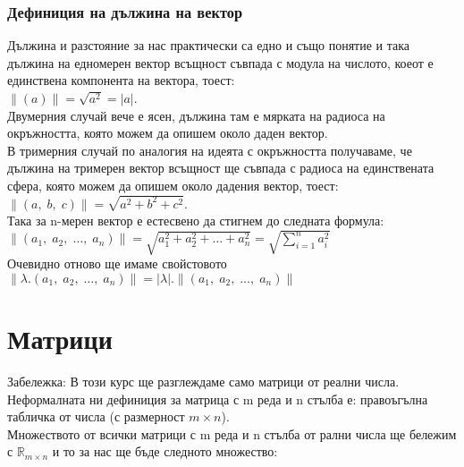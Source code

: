\documentclass[12pt]{article}
\newcommand{\R}{\mathbb{R}}
\begin{document}
\subsubsection*{Дефиниция на дължина на вектор}

Дължина и разстояние за нас практически са едно и също понятие и така
дължина на едномерен вектор всъщност съвпада с модула на числото, коеот е единствена компонента на вектора, тоест:\\

$\|(a)\| = \sqrt{a^2} = |a|$. \\

Двумерния случай вече е ясен, дължина там е мярката на радиоса на окръжността, която можем да опишем около даден вектор. \\

В тримерния случай по аналогия на идеята с окръжността получаваме, че дължина на тримерен вектор всъщност
ще съвпада с радиоса на единствената сфера, която можем да опишем около дадения вектор, тоест: \\

$\|(a, \; b, \; c)\| = \sqrt{a^2 + b^2 + c^2}$. \\

Така за n-мерен вектор е естесвено да стигнем до следната формула: \\

$\|(a_1, \; a_2, \; \dots, \; a_n)\| = \sqrt{a_1^2 + a_2^2 + \dots + a_n^2} = \sqrt{\displaystyle\sum_{i = 1}^n a_i^2}$ \\

Очевидно отново ще имаме свойстовото $\|\lambda.(a_1, \; a_2, \; \dots, \; a_n)\| = |\lambda|.\|(a_1, \; a_2, \; \dots, \; a_n)\|$

\section*{Матрици}

Забележка: В този курс ще разглеждаме само матрици от реални числа. \\

Неформалната ни дефиниция за матрица с m реда и n стълба е: правоъгълна табличка от числа (с размерност $m \times n$). \\

Множеството от всички матрици с m реда и n стълба от рални числа ще бележим с $\R_{m \times n}$ и то за нас ще бъде следното множество: \\\\
\end{document}
